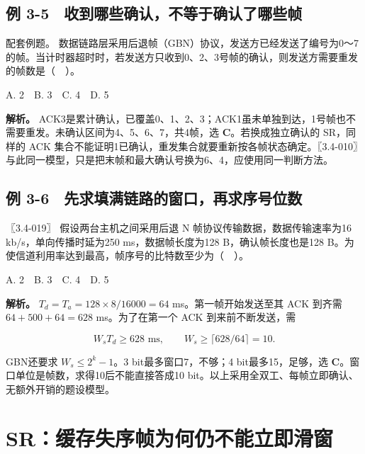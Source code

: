 \subsection{例 3-5　收到哪些确认，不等于确认了哪些帧}\label{CN03-ex5}

{\begin{example}[配套例题]

配套例题。 数据链路层采用后退帧（GBN）协议，发送方已经发送了编号为0～7的帧。当计时器超时时，若发送方只收到0、2、3号帧的确认，则发送方需要重发的帧数是（　）。

A. 2　B. 3　C. 4　D. 5

\end{example}}

\textbf{解析。} ACK3是累计确认，已覆盖0、1、2、3；ACK1虽未单独到达，1号帧也不需要重发。未确认区间为4、5、6、7，共4帧，选 \textbf{C}。若换成独立确认的 SR，同样的 ACK 集合不能证明1已确认，重发集合就要重新按各帧状态确定。〖3.4-010〗与此同一模型，只是把末帧和最大确认号换为6、4，应使用同一判断方法。

\subsection{例 3-6　先求填满链路的窗口，再求序号位数}\label{CN03-ex6}

{\begin{example}[配套例题]

〖3.4-019〗 假设两台主机之间采用后退 N 帧协议传输数据，数据传输速率为16 kb/s，单向传播时延为250 ms，数据帧长度为128 B，确认帧长度也是128 B。为使信道利用率达到最高，帧序号的比特数至少为（　）。

A. 2　B. 3　C. 4　D. 5

\end{example}}

\textbf{解析。} \(T_d=T_a=128\times8/16000=64\) ms。第一帧开始发送至其 ACK 到齐需 \(64+500+64=628\) ms。为了在第一个 ACK 到来前不断发送，需

\[W_sT_d\ge628\text{ ms},\qquad W_s\ge\lceil628/64\rceil=10.\]

GBN还要求 \(W_s\le2^k-1\)。3 bit最多窗口7，不够；4 bit最多15，足够，选 \textbf{C}。窗口单位是帧数，求得10后不能直接答成10 bit。以上采用全双工、每帧立即确认、无额外开销的题设模型。

\section{SR：缓存失序帧为何仍不能立即滑窗}\label{CN03-08}

